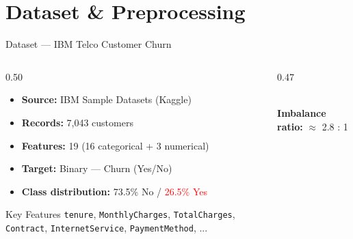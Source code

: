 \documentclass[aspectratio=169,11pt]{beamer}
\begin{document}
\section{Dataset \& Preprocessing}

\begin{frame}{Dataset — IBM Telco Customer Churn}
\begin{columns}[T]
\begin{column}{0.50\textwidth}
\begin{itemize}
    \item \textbf{Source:} IBM Sample Datasets (Kaggle)
    \item \textbf{Records:} 7,043 customers
    \item \textbf{Features:} 19 (16 categorical + 3 numerical)
    \item \textbf{Target:} Binary — Churn (Yes/No)
    \item \textbf{Class distribution:} 73.5\% No / \textcolor{red}{26.5\% Yes}
\end{itemize}
\vspace{4pt}
\begin{exampleblock}{Key Features}
\texttt{tenure}, \texttt{MonthlyCharges}, \texttt{TotalCharges}, \texttt{Contract}, \texttt{InternetService}, \texttt{PaymentMethod}, ...
\end{exampleblock}
\end{column}
\begin{column}{0.47\textwidth}
\centering
{}
\\[10pt]
\small \textbf{Imbalance ratio:} $\approx$ 2.8 : 1
\end{column}
\end{columns}
\end{frame}
\end{document}
